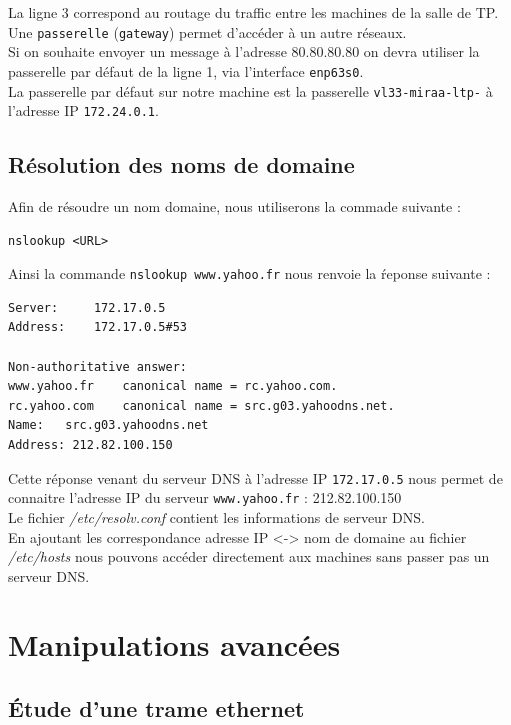 La ligne 3 correspond au routage du traffic entre les machines de la salle de TP.\\
Une \texttt{passerelle} (\texttt{gateway}) permet d'accéder à un autre réseaux.\\
Si on souhaite envoyer un message à l'adresse 80.80.80.80 on devra utiliser la passerelle par défaut de la ligne 1, via l'interface \texttt{enp63s0}.\\
La passerelle par défaut sur notre machine est la passerelle \texttt{vl33-miraa-ltp-} à l'adresse IP \texttt{172.24.0.1}.

\subsection{Résolution des noms de domaine}
Afin de résoudre un nom domaine, nous utiliserons la commade suivante :
\begin{verbatim}
nslookup <URL>
\end{verbatim}
Ainsi la commande \texttt{nslookup www.yahoo.fr} nous renvoie la ŕeponse suivante :
\begin{verbatim}
Server:		172.17.0.5
Address:	172.17.0.5#53

Non-authoritative answer:
www.yahoo.fr	canonical name = rc.yahoo.com.
rc.yahoo.com	canonical name = src.g03.yahoodns.net.
Name:	src.g03.yahoodns.net
Address: 212.82.100.150
\end{verbatim}

Cette réponse venant du serveur DNS à l'adresse IP \texttt{172.17.0.5} nous permet de connaitre l'adresse IP du serveur \texttt{www.yahoo.fr} : 212.82.100.150\\
Le fichier \textit{/etc/resolv.conf} contient les informations de serveur DNS.\\
En ajoutant les correspondance adresse IP <-> nom de domaine au fichier \textit{/etc/hosts} nous pouvons accéder directement aux machines sans passer pas un serveur DNS.

\section{Manipulations avancées}
\subsection{Étude d'une trame ethernet}

